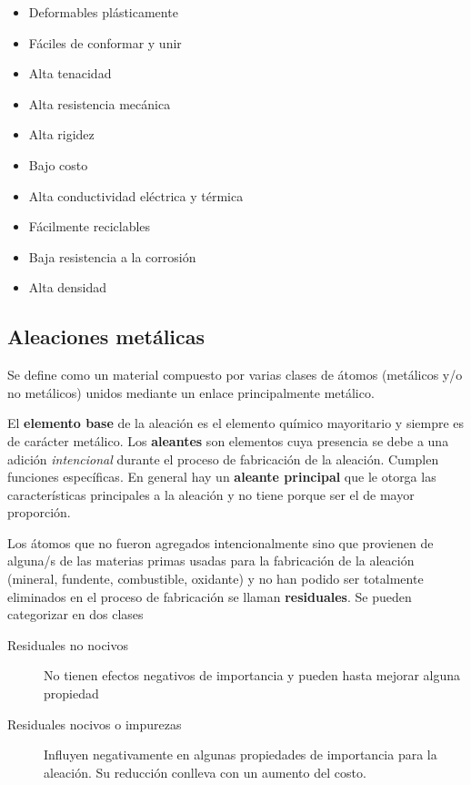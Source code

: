 \begin{itemize}
    \item Deformables plásticamente
    \item Fáciles de conformar y unir
    \item Alta tenacidad
    \item Alta resistencia mecánica
    \item Alta rigidez
    \item Bajo costo
    \item Alta conductividad eléctrica y térmica
    \item Fácilmente reciclables
    \item Baja resistencia a la corrosión
    \item Alta densidad
\end{itemize}



\subsection{Aleaciones metálicas}

Se define como un material compuesto por varias clases de átomos (metálicos y/o no metálicos) unidos mediante un enlace principalmente metálico.

El \textbf{elemento base} de la aleación es el elemento químico mayoritario y siempre es de carácter metálico. Los \textbf{aleantes} son elementos cuya presencia se debe a una adición \textit{intencional} durante el proceso de fabricación de la aleación. Cumplen funciones específicas. En general hay un \textbf{aleante principal} que le otorga las características principales a la aleación y no tiene porque ser el de mayor proporción.

Los átomos que no fueron agregados intencionalmente sino que provienen de alguna/s de las materias primas usadas para la fabricación de la aleación (mineral, fundente, combustible, oxidante) y no han podido ser totalmente eliminados en el proceso de fabricación se llaman \textbf{residuales}. Se pueden categorizar en dos clases

\begin{description}
    \item[Residuales no nocivos] No tienen efectos negativos de importancia y pueden hasta mejorar alguna propiedad
    \item[Residuales nocivos o impurezas] Influyen negativamente en algunas propiedades de importancia para la aleación. Su reducción conlleva con un aumento del costo.  
\end{description}

